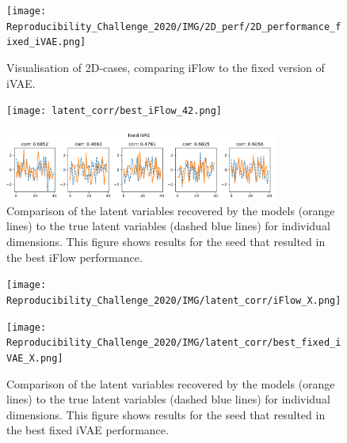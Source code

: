 \begin{figure}[ht]
    \centering
    \texttt{[image: Reproducibility\_Challenge\_2020/IMG/2D\_perf/2D\_performance\_fixed\_iVAE.png]} 
    \caption{Visualisation of 2D-cases, comparing iFlow to the fixed version of iVAE.} 
    \label{fig:fixedMCCscores} 
\end{figure}

\begin{figure}[!htbp]
    \centering
    \begin{minipage}[b]{\textwidth}
        \centering
       \texttt{[image: latent\_corr/best\_iFlow\_42.png]}
    \end{minipage}
    \begin{minipage}[b]{\textwidth}
    \centering
       \includegraphics[width=0.8\textwidth]{IMG/latent_corr/fixed_iVAE_42.png}
    \end{minipage}
    \caption{Comparison of the latent variables recovered by the models (orange lines) to the true latent variables (dashed blue lines) for individual dimensions. This figure shows results for the seed that resulted in the best iFlow performance.}
    \label{fig:latentcorr_fixed1}
\end{figure}

\begin{figure}[!htbp]
    \centering
    \begin{minipage}[b]{\textwidth}
        \centering
       \texttt{[image: Reproducibility\_Challenge\_2020/IMG/latent\_corr/iFlow\_X.png]}
    \end{minipage}
    \begin{minipage}[b]{\textwidth}
    \centering
       \texttt{[image: Reproducibility\_Challenge\_2020/IMG/latent\_corr/best\_fixed\_iVAE\_X.png]}
    \end{minipage}
    \caption{Comparison of the latent variables recovered by the models (orange lines) to the true latent variables (dashed blue lines) for individual dimensions. This figure shows results for the seed that resulted in the best fixed iVAE performance.}
    \label{fig:latentcorr_fixed1}
\end{figure}
